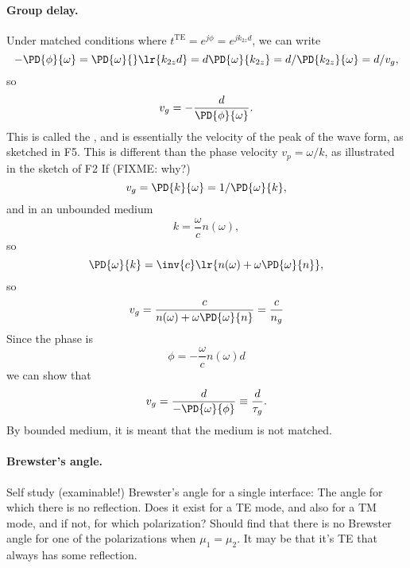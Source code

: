 \paragraph{Group delay.}
%
Under matched conditions where \( t^{\textrm{TE}} = e^{j \phi} = e^{j k_{2z} d} \), we can write
%
\begin{dmath}\label{eqn:emtLecture10:520}
- \PD{\phi}{\omega}
= \PD{\omega}{} \lr{ k_{2z} d }
= d \PD{\omega}{k_{2z}}
= d /\PD{k_{2z}}{\omega}
= d / v_g,
\end{dmath}
%
so
%
\begin{dmath}\label{eqn:emtLecture10:540}
v_g = -\frac{d}{\PD{\phi}{\omega}}.
\end{dmath}
%
This is called the , and is essentially the velocity of the peak of the wave form, as sketched in
%
F5.
%
This is different than the phase velocity \( v_p = \omega/k \), as illustrated in the sketch of
%
F2
%
If (FIXME: why?)
%
\begin{dmath}\label{eqn:emtLecture10:660}
v_g
= \PD{k}{\omega}
= 1/\PD{\omega}{k},
\end{dmath}
%
and in an unbounded medium
\begin{dmath}\label{eqn:emtLecture10:560}
   k = \frac{\omega}{c} n(\omega),
\end{dmath}
%
so
\begin{dmath}\label{eqn:emtLecture10:580}
\PD{\omega}{k}
=
\inv{c} \lr{ n(\omega) + \omega \PD{\omega}{n} },
\end{dmath}
%
so
\begin{equation}\label{eqn:emtLecture10:600}
v_g
= \frac{c}{n(\omega) + \omega \PD{\omega}{n} }
= \frac{c}{n_g}
\end{equation}
%
Since the phase is
%
\begin{dmath}\label{eqn:emtLecture10:680}
\phi = -\frac{\omega}{c} n(\omega) d
\end{dmath}
%
we can show that
\begin{dmath}\label{eqn:emtLecture10:700}
v_g
= \frac{d}{-\PD{\omega}{\phi}}
\equiv
\frac{d}{\tau_g}.
\end{dmath}
%
By bounded medium, it is meant that the medium is not matched.
%
\paragraph{Brewster's angle.}
%
Self study (examinable!) Brewster's angle for a single interface: The angle for which there is no reflection.
%
Does it exist for a TE mode, and also for a TM mode, and if not, for which polarization?
%
Should find that there is no Brewster angle for one of the polarizations when \( \mu_1 = \mu_2 \).  It may be that it's TE that always has some reflection.
%
